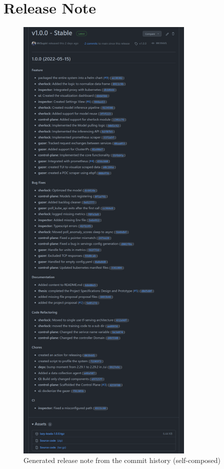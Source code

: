 \section{Release Note}


\begin{figure}[H]
    \includegraphics[height=22.5cm]{assets/appendix/release.png}
    \caption{Generated release note from the commit history (self-composed)}
\end{figure}

